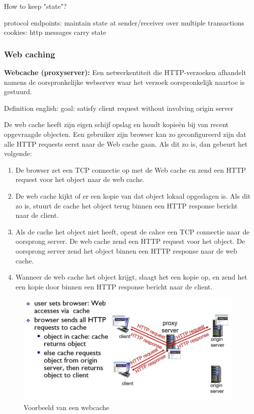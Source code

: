 How to keep "state"?

\bi
\itf protocol endpoints: maintain state at sender/receiver over multiple transactions
\itf cookies: http messages carry state
\ei

\clearpage

\subsubsection{Web caching}

\textbf{Webcache (proxyserver):} Een netwerkentiteit die HTTP-verzoeken afhandelt namens de oorspronkelijke webserver waar het verzoek oorspronkelijk naartoe is gestuurd.

Definition english: goal: satisfy client request without involving origin server

De web cache heeft zijn eigen schijf opslag en houdt kopieën bij van recent opgevraagde objecten. Een gebruiker zijn browser kan zo geconfigureerd zijn dat alle HTTP requests eerst naar de Web cache gaan. Als dit zo is, dan gebeurt het volgende:
\begin{enumerate}
    \item De browser zet een TCP connectie op met de Web cache en zend een HTTP request voor het object naar de web cache.
\item De web cache kijkt of er een kopie van dat object lokaal opgeslagen is. Als dit zo is, stuurt de cache het object terug binnen een HTTP response bericht naar de client.
\item Als de cache het object niet heeft, opent de cahce een TCP connectie naar de oorsprong server. De web cache zend een HTTP request voor het object. De oorsprong server zend het object binnen een HTTP response naar de web cache.
\item Wanneer de web cache het object krijgt, slaagt het een kopie op, en zend het een kopie door binnen een HTTP response bericht naar de client.
\end{enumerate}

\begin{figure}[h]
\centering
\includegraphics[width=4.5in]{./img/imghfdst2/webcache.jpg}
\caption{Voorbeeld van een webcache }
\label{fig:webcache}
\end{figure}

